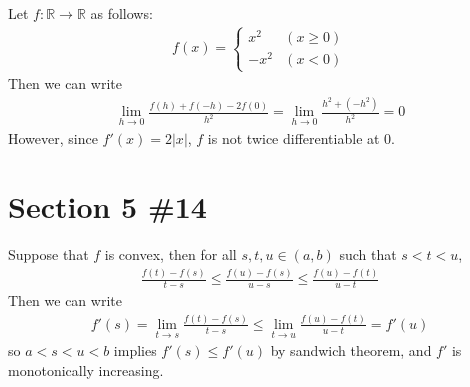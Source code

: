 \documentclass{scrartcl}
\begin{document}
Let \(f : \mathbb{R} \to \mathbb{R}\) as follows:
\begin{align*}
  f(x) = \begin{cases}
    x^2 & (x \geq 0) \\
    -x^2 & (x < 0)
  \end{cases}
\end{align*}
Then we can write
\begin{align*}
  \lim_{h \to 0} \frac{f(h) + f(-h) - 2f(0)}{h^2}
  = \lim_{h \to 0} \frac{h^2 + (-h^2)}{h^2} = 0
\end{align*}
However, since \(f'(x) = 2|x|\), \(f\) is not twice differentiable at 0.

\section{Section 5 \#14}
Suppose that \(f\) is convex, then for all \(s, t, u \in (a, b)\) such that \(s < t < u\),
\begin{align*}
  \frac{f(t) - f(s)}{t - s} \leq \frac{f(u) - f(s)}{u - s} \leq \frac{f(u) - f(t)}{u - t}
\end{align*}
Then we can write
\begin{align*}
  f'(s) = \lim_{t \to s} \frac{f(t) - f(s)}{t - s} \leq \lim_{t \to u} \frac{f(u) - f(t)}{u - t} = f'(u)
\end{align*}
so \(a < s < u < b\) implies \(f'(s) \leq f'(u)\) by sandwich theorem, and \(f'\) is monotonically increasing.
\end{document}
